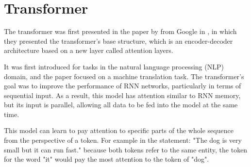 \documentclass{report}[12pt, a4paper]
\begin{document}
\section{Transformer}

The transformer was first presented in the paper \cite{attention_is_all_you_need} by \citeauthor{attention_is_all_you_need} from Google in , in which they presented the transformer's base structure, which is an encoder-decoder architecture based on a new layer called attention layers.


It was first introduced for tasks in the natural language processing (NLP) domain, and the paper focused on a machine translation task. The transformer's goal was to improve the performance of RNN networks, particularly in terms of sequential input. As a result, this model has attention similar to RNN memory, but its input is parallel, allowing all data to be fed into the model at the same time. 

This model can learn to pay attention to specific parts of the whole sequence from the perspective of a token. For example in the statement: "The dog is very small but it can run fast." because both tokens refer to the same entity, the token for the word "it" would pay the most attention to the token of "dog".
\end{document}
